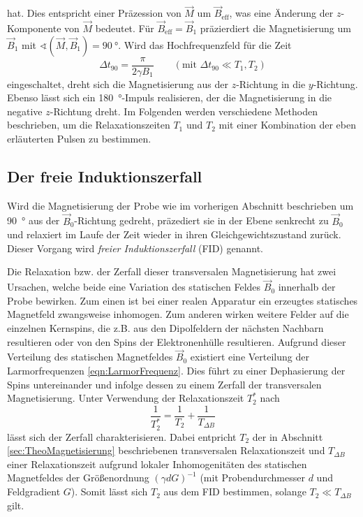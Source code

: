 hat.
Dies entspricht einer Präzession von $\vec{M}$ um $\vec{B}_\text{eff}$,
was eine Änderung der $z$-Komponente von $\vec{M}$ bedeutet.
Für $\vec{B}_\text{eff} = \vec{B}_1$ präzierdiert die Magnetisierung um $\vec{B}_1$
mit $\sphericalangle\!\left(\vec{M}, \vec{B}_1\right) = \SI{90}{\degree}$.
Wird das Hochfrequenzfeld für die Zeit
\begin{equation}
  \Delta t_{90} = \frac{\pi}{2 \gamma B_1}
  \quad\quad (\text{mit } \Delta t_{90} \ll T_1, T_2)
  \label{eqn:t90}
\end{equation}
eingeschaltet, dreht sich die Magnetisierung aus der $z$-Richtung in die
$y$-Richtung.
Ebenso lässt sich ein \SI{180}{\degree}-Impuls realisieren, der die Magnetisierung
in die negative $z$-Richtung dreht.
Im Folgenden werden verschiedene Methoden beschrieben, um die Relaxationszeiten
$T_1$ und $T_2$ mit einer Kombination der eben erläuterten Pulsen zu bestimmen.


\subsection{Der freie Induktionszerfall}
\label{sec:FID}

Wird die Magnetisierung der Probe wie im vorherigen Abschnitt beschrieben um \SI{90}{\degree}
aus der $\vec{B}_0$-Richtung gedreht, präzediert sie in der Ebene senkrecht zu
$\vec{B}_0$ und relaxiert im Laufe der Zeit wieder in ihren Gleichgewichtszustand
zurück. Dieser Vorgang wird \emph{freier Induktionszerfall} (FID) genannt.

Die Relaxation bzw. der Zerfall dieser transversalen Magnetisierung hat zwei Ursachen,
welche beide eine Variation des statischen Feldes $\vec{B}_0$ innerhalb der
Probe bewirken.
Zum einen ist bei einer realen Apparatur ein erzeugtes statisches Magnetfeld
zwangsweise inhomogen.
Zum anderen wirken weitere Felder auf die einzelnen Kernspins,
die z.B. aus den Dipolfeldern der nächsten Nachbarn resultieren oder von den
Spins der Elektronenhülle resultieren.
Aufgrund dieser Verteilung des statischen Magnetfeldes $\vec{B}_0$ existiert eine
Verteilung der Larmorfrequenzen \eqref{eqn:LarmorFrequenz}.
Dies führt zu einer Dephasierung der Spins untereinander und infolge dessen
zu einem Zerfall der transversalen Magnetisierung.
Unter Verwendung der Relaxationszeit $T_2^*$ nach
\begin{equation*}
  \frac{1}{T_2^*} = \frac{1}{T_2} + \frac{1}{T_{\Delta B}}
\end{equation*}
lässt sich der Zerfall charakterisieren.
Dabei entpricht $T_2$ der in Abschnitt \ref{sec:TheoMagnetisierung} beschriebenen
transversalen Relaxationszeit und $T_{\Delta B}$ einer Relaxationszeit aufgrund
lokaler Inhomogenitäten des statischen Magnetfeldes der Größenordnung
$\left(\gamma d G\right)^{-1}$
(mit Probendurchmesser $d$ und Feldgradient $G$).
Somit lässt sich $T_2$ aus dem FID bestimmen, solange $T_2 \ll T_{\Delta B}$
gilt.


